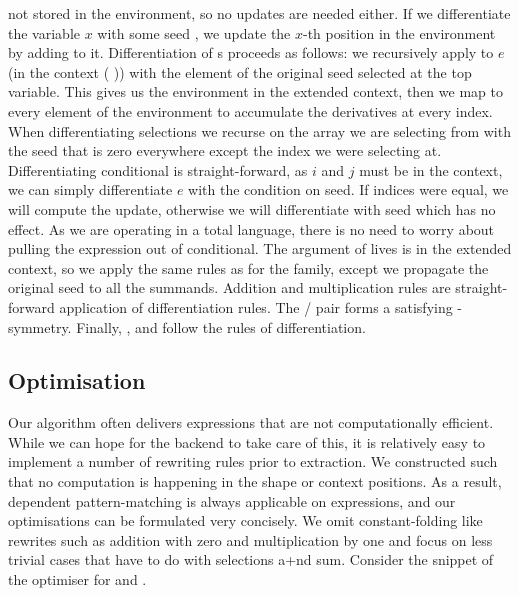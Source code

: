 not stored in the environment, so no updates are needed either.  If we differentiate
the variable $x$ with some seed , we update the $x$-th position in the environment
by adding  to it.  Differentiation of s proceeds as follows: we
recursively apply  to $e$ (in the context   ( ))
with the element of the original seed  selected at the top variable.  This
gives us the environment in the extended context, then we map  to every
element of the environment to accumulate the derivatives at every index.
When differentiating selections we recurse on the array we are
selecting from with the seed that is zero everywhere except the index we were
selecting at.  Differentiating
conditional is straight-forward, as $i$ and $j$ must be in the context, we can
simply differentiate $e$ with the condition on seed.  If indices were equal, we will
compute the update, otherwise we will differentiate with seed  which
has no effect.  As we are operating in a total language, there is no need to worry
about pulling the expression out of conditional.  The argument of 
lives is in the extended context, so we apply the same rules as for the  family,
except we propagate the original seed to all the summands.  Addition and multiplication
rules are straight-forward application of differentiation rules.  The /
pair forms a satisfying -symmetry.  Finally, ,  and
 follow the rules of differentiation.





\subsection{Optimisation\label{sec:opt}}

Our algorithm often delivers expressions that are not computationally efficient.
While we can hope for the backend to take care of this, it is relatively
easy to implement a number of rewriting rules prior to extraction.  
We constructed  such that no computation is happening in the shape
or context positions.  As a result, dependent pattern-matching is always
applicable on  expressions, and our optimisations can be formulated
very concisely.  We omit constant-folding like rewrites such as addition
with zero and multiplication by one and focus on less trivial cases that have
to do with selections a+nd sum.  Consider the snippet of the optimiser for
 and .


